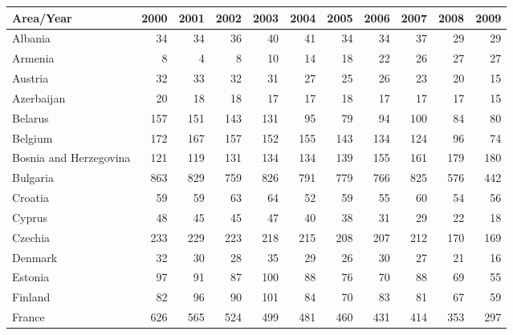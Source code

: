 \begin{table}
 \scriptsize
 \centering
 \begin{tabular}{|l|r|r|r|r|r|r|r|r|r|r|}
 \hline
                     Area/Year&   2000&   2001&   2002&   2003&   2004&   2005&   2006&   2007&   2008&   2009\\\hline\hline
                       Albania&     34&     34&     36&     40&     41&     34&     34&     37&     29&     29\\\hline
                       Armenia&      8&      4&      8&     10&     14&     18&     22&     26&     27&     27\\\hline
                       Austria&     32&     33&     32&     31&     27&     25&     26&     23&     20&     15\\\hline
                    Azerbaijan&     20&     18&     18&     17&     17&     18&     17&     17&     17&     15\\\hline
                       Belarus&    157&    151&    143&    131&     95&     79&     94&    100&     84&     80\\\hline
                       Belgium&    172&    167&    157&    152&    155&    143&    134&    124&     96&     74\\\hline
        Bosnia and Herzegovina&    121&    119&    131&    134&    134&    139&    155&    161&    179&    180\\\hline
                      Bulgaria&    863&    829&    759&    826&    791&    779&    766&    825&    576&    442\\\hline
                       Croatia&     59&     59&     63&     64&     52&     59&     55&     60&     54&     56\\\hline
                        Cyprus&     48&     45&     45&     47&     40&     38&     31&     29&     22&     18\\\hline
                       Czechia&    233&    229&    223&    218&    215&    208&    207&    212&    170&    169\\\hline
                       Denmark&     32&     30&     28&     35&     29&     26&     30&     27&     21&     16\\\hline
                       Estonia&     97&     91&     87&    100&     88&     76&     70&     88&     69&     55\\\hline
                       Finland&     82&     96&     90&    101&     84&     70&     83&     81&     67&     59\\\hline
                        France&    626&    565&    524&    499&    481&    460&    431&    414&    353&    297\\\hline

\end{tabular}
\end{table}
